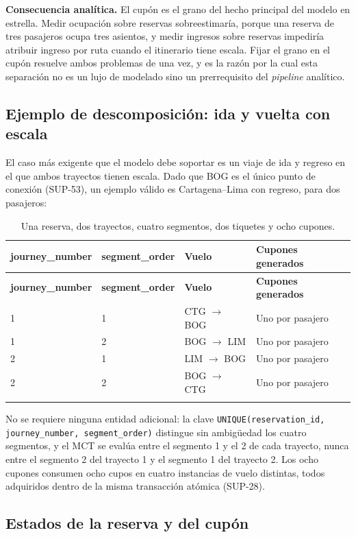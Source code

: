 \documentclass[10pt,letterpaper]{article}
\newcommand{\nota}[1]{%
  \begin{tcolorbox}[colback=cajaFondo,colframe=usaAzul!60,sharp corners=south]#1\end{tcolorbox}}
\begin{document}
\nota{\textbf{Consecuencia analítica.} El cupón es el grano del hecho principal del modelo en estrella. Medir ocupación sobre reservas sobreestimaría, porque una reserva de tres pasajeros ocupa tres asientos, y medir ingresos sobre reservas impediría atribuir ingreso por ruta cuando el itinerario tiene escala. Fijar el grano en el cupón resuelve ambos problemas de una vez, y es la razón por la cual esta separación no es un lujo de modelado sino un prerrequisito del \emph{pipeline} analítico.}

\subsection{Ejemplo de descomposición: ida y vuelta con escala}

El caso más exigente que el modelo debe soportar es un viaje de ida y regreso en el que ambos trayectos tienen escala. Dado que BOG es el único punto de conexión (SUP-53), un ejemplo válido es Cartagena--Lima con regreso, para dos pasajeros:

\begin{longtable}{@{}C{2.6cm} C{2.6cm} L{3.6cm} L{5.6cm}@{}}
\toprule \textbf{journey\_number} & \textbf{segment\_order} & \textbf{Vuelo} & \textbf{Cupones generados} \\ \midrule \endfirsthead
\toprule \textbf{journey\_number} & \textbf{segment\_order} & \textbf{Vuelo} & \textbf{Cupones generados} \\ \midrule {} & 1 & CTG $\rightarrow$ BOG & Uno por pasajero \\
1 & 2 & BOG $\rightarrow$ LIM & Uno por pasajero \\
2 & 1 & LIM $\rightarrow$ BOG & Uno por pasajero \\
2 & 2 & BOG $\rightarrow$ CTG & Uno por pasajero \\
\bottomrule
\caption{Una reserva, dos trayectos, cuatro segmentos, dos tiquetes y ocho cupones.}
\end{longtable}

No se requiere ninguna entidad adicional: la clave \texttt{UNIQUE(reservation\_id, journey\_number, segment\_order)} distingue sin ambigüedad los cuatro segmentos, y el MCT se evalúa entre el segmento 1 y el 2 de cada trayecto, nunca entre el segmento 2 del trayecto 1 y el segmento 1 del trayecto 2. Los ocho cupones consumen ocho cupos en cuatro instancias de vuelo distintas, todos adquiridos dentro de la misma transacción atómica (SUP-28).

\subsection{Estados de la reserva y del cupón}
\end{document}
